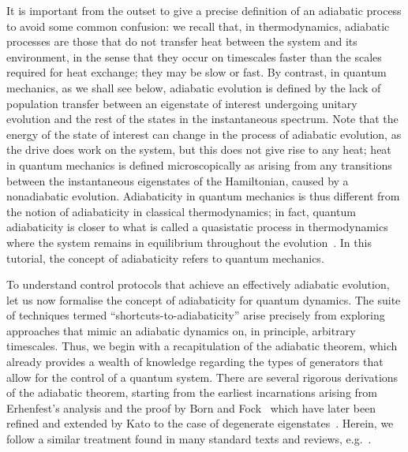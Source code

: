 It is important from the outset to give a precise definition of an adiabatic process to avoid some common confusion: we recall that, in thermodynamics, adiabatic processes are those that do not transfer heat between the system and its environment, in the sense that they occur on timescales faster than the scales required for heat exchange; they may be slow or fast. By contrast, in quantum mechanics, as we shall see below, adiabatic evolution is defined by the lack of population transfer between an eigenstate of interest undergoing unitary evolution and the rest of the states in the instantaneous spectrum. Note that the energy of the state of interest can change in the process of adiabatic evolution, as the drive does work on the system, but this does not give rise to any heat; heat in quantum mechanics is defined microscopically as arising from any transitions between the instantaneous eigenstates of the Hamiltonian, caused by a nonadiabatic evolution. Adiabaticity in quantum mechanics is thus different from the notion of adiabaticity in classical thermodynamics; in fact, quantum adiabaticity is closer to what is called a quasistatic process in thermodynamics where the system remains in equilibrium throughout the evolution~\cite{dalessio2016quantum}. In this tutorial, the concept of adiabaticity refers to quantum mechanics.

To understand control protocols that achieve an effectively adiabatic evolution, let us now formalise the concept of adiabaticity for quantum dynamics. The suite of techniques termed ``shortcuts-to-adiabaticity'' arise precisely from exploring approaches that mimic an adiabatic dynamics on, in principle, arbitrary timescales. Thus, we begin with a recapitulation of the adiabatic theorem, which already provides a wealth of knowledge regarding the types of generators that allow for the control of a quantum system. There are several rigorous derivations of the adiabatic theorem, starting from the earliest incarnations arising from Erhenfest's analysis and the proof by Born and Fock~\cite{Born1928} which have later been refined and extended by Kato to the case of degenerate eigenstates~\cite{Kato1950}. Herein, we follow a similar treatment found in many standard texts and reviews, e.g.~\cite{BudichReview}.

